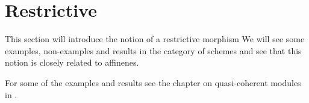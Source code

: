\chapter{Restrictive}
This section will introduce the notion of a restrictive morphism
We will see some examples, non-examples and results in the category of schemes
and see that this notion is closely related to affinenes.

For some of the examples and results see the chapter on quasi-coherent modules in \cite{vakil}.










